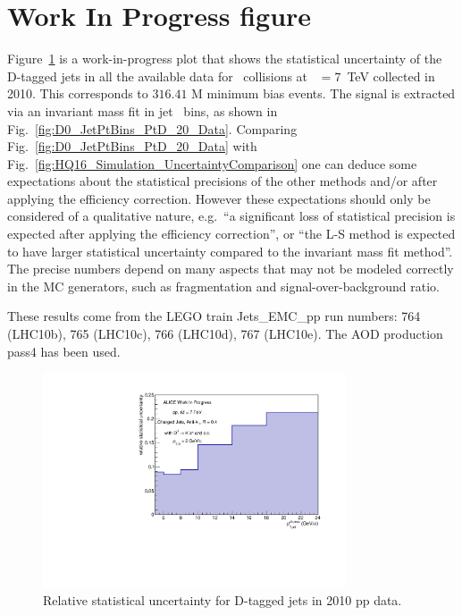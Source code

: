 \section{Work In Progress figure}
Figure~\ref{fig:HQ16_WorkInProgress_StatisticalUncertainty} is a work-in-progress plot that shows the statistical uncertainty 
of the D-tagged jets in all the available data for \pp\ collisions at \s~$=7$~TeV collected in 2010.
This corresponds to $316.41$ M minimum bias events. The signal is extracted via an invariant mass fit 
in jet \pt\ bins, as shown in Fig.~\ref{fig:D0_JetPtBins_PtD_20_Data}. 
Comparing Fig.~\ref{fig:D0_JetPtBins_PtD_20_Data} with Fig.~\ref{fig:HQ16_Simulation_UncertaintyComparison} one can
deduce some expectations about the statistical precisions of the other methods and/or after applying the efficiency correction.
However these expectations should only be considered of a qualitative nature, e.g.\ ``a significant loss of statistical precision
is expected after applying the efficiency correction'', or ``the L-S method is expected to have larger statistical uncertainty compared
to the invariant mass fit method''. The precise numbers depend on many aspects that may not be modeled correctly
in the MC generators, such as fragmentation and signal-over-background ratio.

These results come from the LEGO train Jets\_EMC\_pp run numbers: 764 (LHC10b),
765 (LHC10c), 766 (LHC10d), 767 (LHC10e). The AOD production pass4 has been used.
\begin{figure}[tbh]
\begin{center}
\includegraphics[width=0.8\textwidth]{img/HQ16_WorkInProgress_StatisticalUncertainty}
 \caption{Relative statistical uncertainty for D-tagged jets in 2010 pp data.} 
 \label{fig:HQ16_WorkInProgress_StatisticalUncertainty}
\end{center}
\end{figure}

